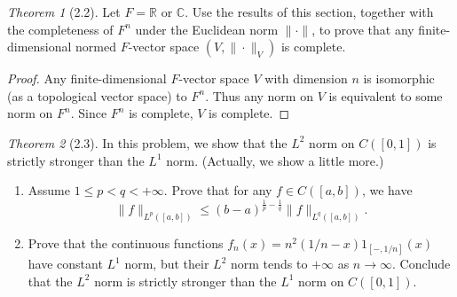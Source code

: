 \documentclass[12pt]{article}
\theoremstyle{remark}
\theoremstyle{named}
\newtheorem*{theorem}{Theorem}
\newcommand{\R}{\mathbb R}
\newcommand{\C}{\mathbb C}
\begin{document}
\begin{theorem}[2.2]
    Let \(F = \R\) or \(\C\). Use the results of this section, together with the completeness of \(F^n\) under the Euclidean norm \(\|\cdot\|\), to prove that any finite-dimensional normed \(F\)-vector space \((V, \|\cdot\|_V)\) is complete.
\end{theorem}

\begin{proof}
    Any finite-dimensional \(F\)-vector space \(V\) with dimension \(n\) is isomorphic (as a topological vector space) to \(F^n\). Thus any norm on \(V\) is equivalent to some norm on \(F^n\). Since \(F^n\) is complete, \(V\) is complete.
\end{proof}

\begin{theorem}[2.3]
    In this problem, we show that the \(L^2\) norm on \(C([0, 1])\) is strictly stronger than the \(L^1\) norm. (Actually, we show a little more.)
    \begin{enumerate}
        \item Assume \(1 \leq p < q < +\infty\). Prove that for any \(f \in C([a, b])\), we have
        \[\|f\|_{L^p([a, b])} \leq (b - a)^{\frac{1}{p} - \frac{1}{q}} \|f\|_{L^q([a, b])}.\]
        \item Prove that the continuous functions \(f_n(x) = n^2 (1/n - x) 1_{[-, 1/n]}(x)\) have constant \(L^1\) norm, but their \(L^2\) norm tends to \(+\infty\) as \(n \to \infty\). Conclude that the \(L^2\) norm is strictly stronger than the \(L^1\) norm on \(C([0, 1])\).
    \end{enumerate}
\end{theorem}
\end{document}
